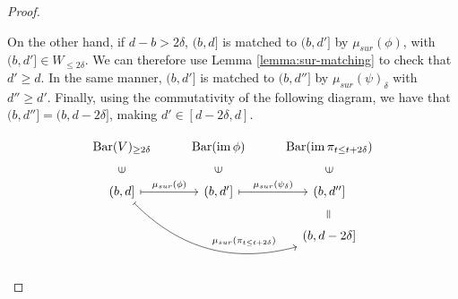\begin{proof}
\begin{enumerate}
    On the other hand, if $ d - b > 2 \delta $, $(b, d]$ is matched to $ (b, d'] $ by $ \mu_{sur}(\phi)$, with $ (b, d'] \in W_{\leq 2 \delta}$. We can therefore use Lemma \ref{lemma:sur-matching} to check that $ d' \geq d$. In the same manner, $(b, d']$ is matched to $ (b, d''] $ by $ \mu_{sur}(\psi)_\delta $ with $ d'' \geq d' $. Finally, using the commutativity of the following diagram, we have that $ (b, d''] = (b, d - 2 \delta] $, making $ d' \in [d - 2 \delta, d]$.

    $$
    \begin{tikzcd}
    \barc(V)_{\geq 2 \delta}
    & \barc(\im \phi)
    & \barc(\im \pi_{t \leq t+2\delta}) \\
    (b, d] \arrow[r, mapsto, "\mu_{sur}(\phi)"] \arrow[u, phantom, "{\rotatebox{90}{$\in$}}"] \arrow[rrd, mapsto, bend right, "\mu_{sur}(\pi_{t \leq t+2\delta})" ]
    & (b, d'] \arrow[r, mapsto, "\mu_{sur}(\psi_\delta)"] \arrow[u, phantom, "{\rotatebox{90}{$\in$}}"]
    & (b, d''] \arrow[u, phantom, "{\rotatebox{90}{$\in$}}"] \\
    &
    & (b, d - 2 \delta] \arrow[u, phantom, "{\rotatebox{90}{$=$}}"]
    \end{tikzcd}
    $$
\end{enumerate}
\end{proof}

